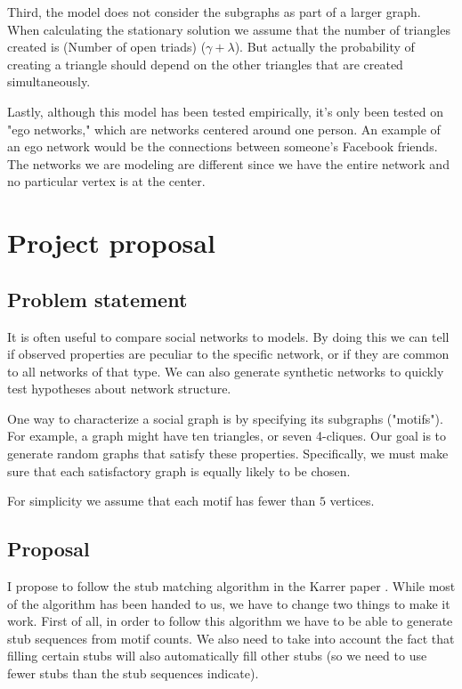 \documentclass[12pt]{article}
\begin{document}
Third, the model does not consider the subgraphs as part of a larger graph.  When calculating the stationary solution we assume that the number of triangles created is (Number of open triads) ($\gamma + \lambda$).  But actually the probability of creating a triangle should depend on the other triangles that are created simultaneously.

Lastly, although this model has been tested empirically, it's only been tested on "ego networks," which are networks centered around one person.  An example of an ego network would be the connections between someone's Facebook friends.  The networks we are modeling are different since we have the entire network and no particular vertex is at the center.

\section{Project proposal}
\subsection{Problem statement}
It is often useful to compare social networks to models.  By doing this we can tell if observed properties are peculiar to the specific network, or if they are common to all networks of that type.  We can also generate synthetic networks to quickly test hypotheses about network structure.

One way to characterize a social graph is by specifying its subgraphs ("motifs").  For example, a graph might have ten triangles, or seven 4-cliques.  Our goal is to generate random graphs that satisfy these properties.  Specifically, we must make sure that each satisfactory graph is equally likely to be chosen.

For simplicity we assume that each motif has fewer than $5$ vertices.

\subsection{Proposal}
I propose to follow the stub matching algorithm in the Karrer paper \cite{karrer}.  While most of the algorithm has been handed to us, we have to change two things to make it work.  First of all, in order to follow this algorithm we have to be able to generate stub sequences from motif counts.  We also need to take into account the fact that filling certain stubs will also automatically fill other stubs (so we need to use fewer stubs than the stub sequences indicate).
\end{document}
